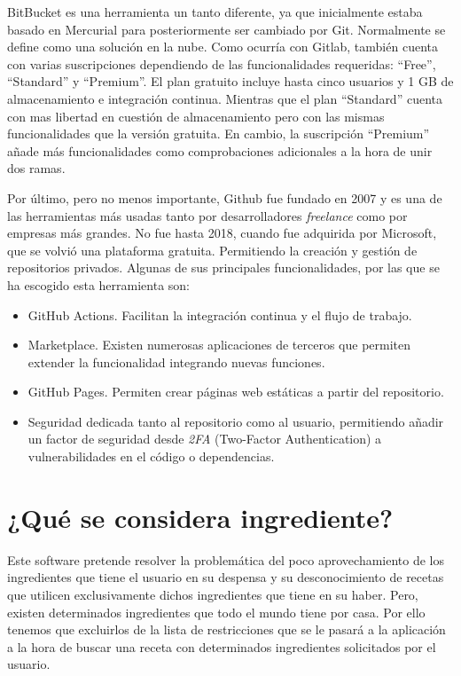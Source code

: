 BitBucket es una herramienta un tanto diferente, ya que inicialmente estaba basado en Mercurial para posteriormente ser cambiado por Git. Normalmente se define como una solución en la nube. Como ocurría con Gitlab, también cuenta con varias suscripciones dependiendo de las funcionalidades requeridas: ``Free'', ``Standard'' y ``Premium''. El plan gratuito incluye hasta cinco usuarios y 1 GB de almacenamiento e integración continua. Mientras que el plan ``Standard'' cuenta con mas libertad en cuestión de almacenamiento pero con las mismas funcionalidades que la versión gratuita. En cambio, la suscripción ``Premium'' añade más funcionalidades como comprobaciones adicionales a la hora de unir dos ramas. 

Por último, pero no menos importante, Github fue fundado en 2007 y es una de las herramientas más usadas tanto por desarrolladores \emph{freelance} como por empresas más grandes. No fue hasta 2018, cuando fue adquirida por Microsoft, que se volvió una plataforma gratuita. Permitiendo la creación y gestión de repositorios privados. Algunas de sus principales funcionalidades, por las que se ha escogido esta herramienta son:
\begin{itemize}
    \item GitHub Actions. Facilitan la integración continua y el flujo de trabajo.
    \item Marketplace. Existen numerosas aplicaciones de terceros que permiten extender la funcionalidad integrando nuevas funciones.
    \item GitHub Pages. Permiten crear páginas web estáticas a partir del repositorio. 
    \item Seguridad dedicada tanto al repositorio como al usuario, permitiendo añadir un factor de seguridad desde \emph{2FA} (Two-Factor Authentication) a vulnerabilidades en el código o dependencias. 
\end{itemize}

\section{¿Qué se considera ingrediente?}
Este software pretende resolver la problemática del poco aprovechamiento de los ingredientes que tiene el usuario en su despensa y su desconocimiento de recetas que utilicen exclusivamente dichos ingredientes que tiene en su haber. Pero, existen determinados ingredientes que todo el mundo tiene por casa. Por ello tenemos que excluirlos de la lista de restricciones que se le pasará a la aplicación a la hora de buscar una receta con determinados ingredientes solicitados por el usuario. 

